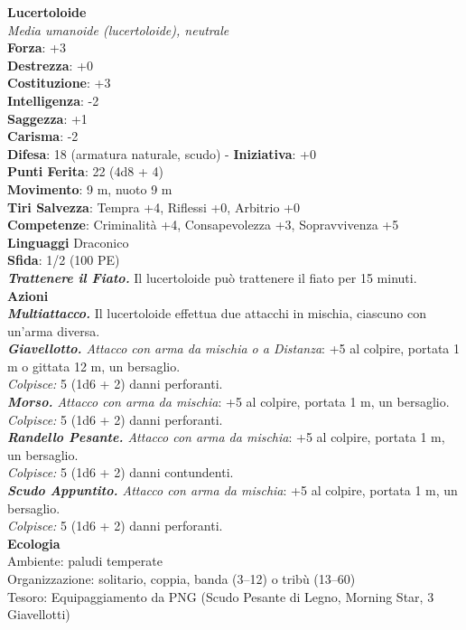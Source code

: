 \begin{multicols}{2}
\medskip\textbf{Lucertoloide}\\
\emph{Media umanoide (lucertoloide), neutrale}\\
\textbf{Forza}: +3\\
\textbf{Destrezza}: +0\\
\textbf{Costituzione}: +3\\
\textbf{Intelligenza}: -2\\
\textbf{Saggezza}: +1\\
\textbf{Carisma}: -2\\
\textbf{Difesa}: 18 (armatura naturale, scudo) - \textbf{Iniziativa}: +0\\
\textbf{Punti Ferita}: 22 (4d8 + 4)\\
\textbf{Movimento}: 9 m, nuoto 9 m\\
\textbf{Tiri Salvezza}: Tempra +4, Riflessi +0, Arbitrio +0\\
\textbf{Competenze}: Criminalità +4, Consapevolezza +3, Sopravvivenza +5\\
\textbf{Linguaggi} Draconico\\
\textbf{Sfida}: 1/2 (100 PE)\smallskip\\

\emph{\textbf{Trattenere il Fiato.}} Il lucertoloide può trattenere il fiato per 15 minuti.\\
\smallskip\textbf{Azioni}\\
\emph{\textbf{Multiattacco.}} Il lucertoloide effettua due attacchi in mischia, ciascuno con un'arma diversa.\\
\emph{\textbf{Giavellotto.} Attacco con arma da mischia o a Distanza}: +5 al colpire, portata 1 m o gittata 12 m, un bersaglio. \\
\emph{Colpisce:} 5 (1d6 + 2) danni perforanti.\\
\emph{\textbf{Morso.} Attacco con arma da mischia}: +5 al colpire, portata 1 m, un bersaglio.\\
\emph{Colpisce:} 5 (1d6 + 2) danni perforanti.\\
\emph{\textbf{Randello Pesante.} Attacco con arma da mischia}: +5 al colpire, portata 1 m, un bersaglio.\\
\emph{Colpisce:} 5 (1d6 + 2) danni contundenti. \\
\emph{\textbf{Scudo Appuntito.} Attacco con arma da mischia}: +5 al colpire, portata 1 m, un bersaglio.\\
\emph{Colpisce:} 5 (1d6 + 2) danni perforanti.\\
\textbf{Ecologia}\\
Ambiente: paludi temperate\\
Organizzazione: solitario, coppia, banda (3–12) o tribù (13–60)\\
Tesoro: Equipaggiamento da PNG (Scudo Pesante di Legno, Morning Star, 3 Giavellotti)\\


\end{multicols}
